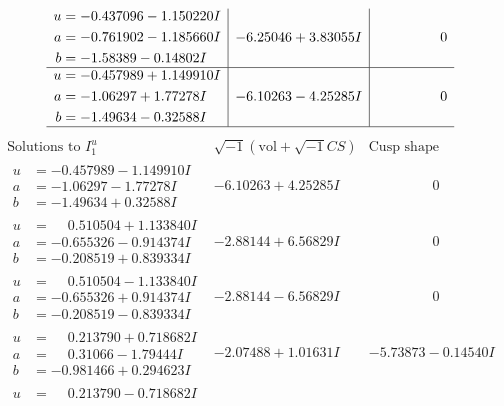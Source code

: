 \documentclass[1p]{elsarticle_modified}
\theoremstyle{definition}
\newcommand{\I}{\sqrt{-1}}
\begin{document}
$$\begin{array}{c|c|c}
\begin{aligned}
u &= -0.437096 - 1.150220 I \\
a &= -0.761902 - 1.185660 I \\
b &= -1.58389 - 0.14802 I\end{aligned}
 & -6.25046 + 3.83055 I & \phantom{-0.000000 } 0 \\ \hline\begin{aligned}
u &= -0.457989 + 1.149910 I \\
a &= -1.06297 + 1.77278 I \\
b &= -1.49634 - 0.32588 I\end{aligned}
 & -6.10263 - 4.25285 I & \phantom{-0.000000 } 0\\
 \hline 
 \end{array}$$\newpage$$\begin{array}{c|c|c}  
\text{Solutions to }I^u_{1}& \I (\text{vol} + \sqrt{-1}CS) & \text{Cusp shape}\\
 \hline 
\begin{aligned}
u &= -0.457989 - 1.149910 I \\
a &= -1.06297 - 1.77278 I \\
b &= -1.49634 + 0.32588 I\end{aligned}
 & -6.10263 + 4.25285 I & \phantom{-0.000000 } 0 \\ \hline\begin{aligned}
u &= \phantom{-}0.510504 + 1.133840 I \\
a &= -0.655326 - 0.914374 I \\
b &= -0.208519 + 0.839334 I\end{aligned}
 & -2.88144 + 6.56829 I & \phantom{-0.000000 } 0 \\ \hline\begin{aligned}
u &= \phantom{-}0.510504 - 1.133840 I \\
a &= -0.655326 + 0.914374 I \\
b &= -0.208519 - 0.839334 I\end{aligned}
 & -2.88144 - 6.56829 I & \phantom{-0.000000 } 0 \\ \hline\begin{aligned}
u &= \phantom{-}0.213790 + 0.718682 I \\
a &= \phantom{-}0.31066 - 1.79444 I \\
b &= -0.981466 + 0.294623 I\end{aligned}
 & -2.07488 + 1.01631 I & -5.73873 - 0.14540 I \\ \hline\begin{aligned}
u &= \phantom{-}0.213790 - 0.718682 I \\

\end{aligned}
\end{array}$$
\end{document}
